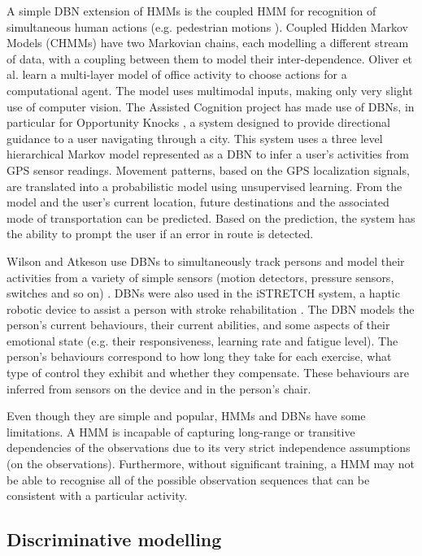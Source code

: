 A simple DBN extension of HMMs is the coupled HMM for recognition of simultaneous human actions (e.g. pedestrian motions \cite{Brand1997}). Coupled Hidden Markov Models (CHMMs) have two Markovian chains, each modelling a different stream of data, with a coupling between them to model their inter-dependence. Oliver et al. \cite{Oliver2004} learn a multi-layer model of office activity to choose actions for a computational agent. The model uses multimodal inputs, making only very slight use of computer vision. The Assisted Cognition project \cite{Kautz2002} has made use of DBNs, in particular for Opportunity Knocks \cite{Liao2007a}, a system designed to provide directional guidance to a user navigating through a city. This system uses a three level hierarchical Markov model represented as a DBN to infer a user’s activities from GPS sensor readings. Movement patterns, based on the GPS localization signals, are translated into a probabilistic model using unsupervised learning. From the model and the user’s current location, future destinations and the associated mode of transportation can be predicted. Based on the prediction, the system has the ability to prompt the user if an error in route is detected.

Wilson and Atkeson use DBNs to simultaneously track persons and model their activities from a variety of simple sensors (motion detectors, pressure sensors, switches and so on) \cite{Wilson2005}. DBNs were also used in the iSTRETCH system, a haptic robotic device to assist a person with stroke rehabilitation \cite{Kan2011}. The DBN models the person’s current behaviours, their current abilities, and some aspects of their emotional state (e.g. their responsiveness, learning rate and fatigue level). The person’s behaviours correspond to how long they take for each exercise, what type of control they exhibit and whether they compensate. These behaviours are inferred from sensors on the device and in the person’s chair.

Even though they are simple and popular, HMMs and DBNs have some limitations. A HMM is incapable of capturing long-range or transitive dependencies of the observations due to its very strict independence assumptions (on the observations). Furthermore, without significant training, a HMM may not be able to recognise all of the possible observation sequences that can be consistent with a particular activity.

\subsection{Discriminative modelling}

